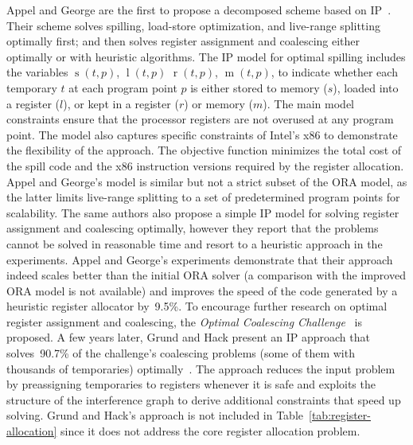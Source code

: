 \documentclass[acmsmall,authorversion,nonacm]{acmart}
\newcommand{\noMathVar}[2]{\operatorname{#1}(#2)}
\newcommand{\var}[2]{$\noMathVar{#1}{#2}$}
\begin{document}
Appel and George are the first to propose a decomposed scheme based on
IP~\cite{Appel2001}.
Their scheme solves spilling, load-store optimization, and live-range
splitting optimally first; and then solves register assignment and
coalescing either optimally or with heuristic algorithms.
The IP model for optimal spilling includes the variables \var{s}{t,p},
\var{l}{t,p} \var{r}{t,p}, \var{m}{t,p}, to indicate whether each
temporary $t$ at each program point $p$ is either stored to memory
($s$), loaded into a register ($l$), or kept in a register ($r$) or
memory ($m$).
The main model constraints ensure that the processor registers are not
overused at any program point.
The model also captures specific constraints of Intel's x86 to
demonstrate the flexibility of the approach.
The objective function minimizes the total cost of the spill code and
the x86 instruction versions required by the register allocation.
Appel and George's model is similar but not a strict subset of the ORA
model, as the latter limits live-range splitting to a set of
predetermined program points for scalability.
The same authors also propose a simple IP model for solving register
assignment and coalescing optimally, however they report that the
problems cannot be solved in reasonable time and resort to a heuristic
approach in the experiments.
Appel and George's experiments demonstrate that their approach indeed
scales better than the initial ORA solver (a comparison with the
improved ORA model is not available) and improves the speed of the
code generated by a heuristic register allocator by~9.5\%.
To encourage further research on optimal register assignment and
coalescing, the \emph{Optimal Coalescing Challenge}~\cite{OCC} is
proposed.
A few years later, Grund and Hack present an IP approach that
solves~90.7\% of the challenge's coalescing problems (some of them
with thousands of temporaries) optimally~\cite{Grund2007}.
The approach reduces the input problem by preassigning temporaries to
registers whenever it is safe and exploits the structure of the
interference graph to derive additional constraints that speed up
solving.
Grund and Hack's approach is not included in
Table~\ref{tab:register-allocation} since it does not address the core
register allocation problem.
\end{document}
